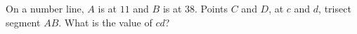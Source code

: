 On a number line, $A$ is at $11$ and $B$ is at $38$. Points $C$ and $D$, at $c$ and $d$, trisect segment $AB$. What is the value of $cd$?
